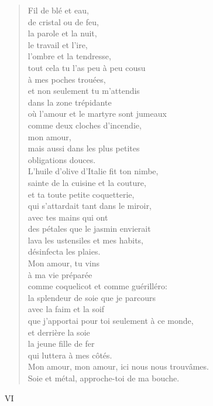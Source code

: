 \documentclass[11pt,a4paper]{book}
\begin{document}
\begin{verse}
Fil de blé et eau, \\
de cristal ou de feu, \\
la parole et la nuit, \\
le travail et l'ire, \\
l'ombre et la tendresse, \\
tout cela tu l'as peu à peu cousu \\
à mes poches trouées, \\
et non seulement tu m'attendis \\
dans la zone trépidante \\
où l'amour et le martyre sont jumeaux  \\
comme deux cloches d'incendie, \\
mon amour, \\
mais aussi dans les plus petites \\
obligations douces. \\
L'huile d'olive d'Italie fit ton nimbe, \\
sainte de la cuisine et la couture, \\
et ta toute petite coquetterie, \\
qui s'attardait tant dans le miroir, \\
avec tes mains qui ont \\
des pétales que le jasmin envierait \\
lava les ustensiles et mes habits, \\
désinfecta les plaies. \\
Mon amour, tu vins \\
à ma vie préparée \\
comme coquelicot et comme guérilléro: \\
la splendeur de soie que je parcours \\
avec la faim et la soif \\
que j'apportai pour toi seulement à ce monde, \\
et derrière la soie \\
la jeune fille de fer \\
qui luttera à mes côtés. \\
Mon amour, mon amour, ici nous nous trouvâmes. \\
Soie et métal, approche-toi de ma bouche.
\end{verse}

\newpage

{\huge VI} \\ \\
\end{document}
